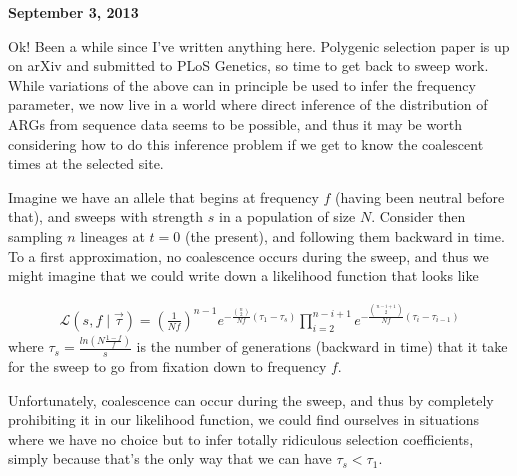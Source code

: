 \documentclass[reqno]{amsart}
\begin{document}
\begin{flushright}
	\textbf{September 3, 2013}
\end{flushright}

Ok! Been a while since I've written anything here. Polygenic selection paper is up on arXiv and submitted to PLoS Genetics, so time to get back to sweep work. While variations of the above can in principle be used to infer the frequency parameter, we now live in a world where direct inference of the distribution of ARGs from sequence data seems to be possible\cite{Rasmussen:2013wv}, and thus it may be worth considering how to do this inference problem if we get to know the coalescent times at the selected site.

Imagine we have an allele that begins at frequency $f$ (having been neutral before that), and sweeps with strength $s$ in a population of size $N$. Consider then sampling $n$ lineages at $t=0$ (the present), and following them backward in time. To a first approximation, no coalescence occurs during the sweep, and thus we might imagine that we could write down a likelihood function that looks like

\begin{align}
	\mathcal{L}(s,f\mid \vec{\tau}) = \left(\frac{1}{Nf}\right)^{n-1} e^{-\frac{\binom{n}{2}}{Nf}\left(\tau_1 - \tau_s\right)}\prod_{i=2}^{n-i+1}e^{-\frac{\binom{n-i+1}{2}}{Nf}\left(\tau_i-\tau_{i-1}\right)}
\end{align}
where $\tau_s = \frac{ln(N\frac{1-f}{f})}{s}$ is the number of generations (backward in time) that it take for the sweep to go from fixation down to frequency $f$.

Unfortunately, coalescence can occur during the sweep, and thus by completely prohibiting it in our likelihood function, we could find ourselves in situations where we have no choice but to infer totally ridiculous selection coefficients, simply because that's the only way that we can have $\tau_s<\tau_1$.
\end{document}
